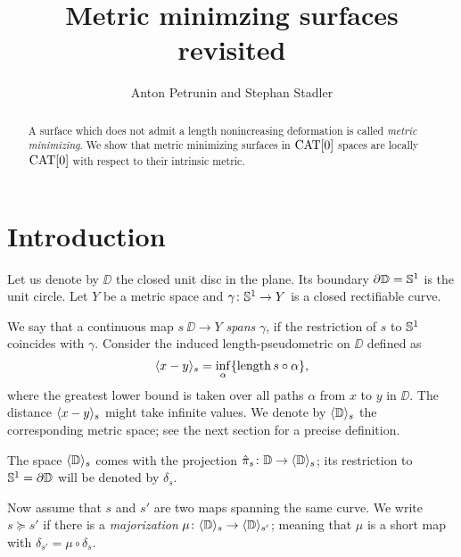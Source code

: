 \documentclass{article}
\begin{document}
\title{Metric minimzing surfaces revisited}
\author{Anton Petrunin and Stephan Stadler}


\date{}

\maketitle

\begin{abstract}
A surface which does not admit a length nonincreasing deformation is called \emph{metric minimizing}.
We show that metric minimizing surfaces in $\mathop{\rm CAT}\nolimits[0]$ spaces are locally $\mathop{\rm CAT}\nolimits[0]$ with respect to their intrinsic metric. 
\end{abstract}

\section{Introduction}

Let us denote by $\DD$ the closed unit disc in the plane.
Its boundary $\partial \mathbb{D}=\mathbb{S}^1$ is the unit circle.
Let $Y$ be a metric space and $\gamma\colon\mathbb{S}^1\to Y$ is a closed rectifiable curve.

We say that a continuous map $s\:\DD\to Y$ \emph{spans} $\gamma$,
if the restriction of $s$ to $\mathbb{S}^1$ coincides with $\gamma$.
Consider the induced length-pseudometric on $\DD$ defined as 
\[\langle x-y\rangle_s=\inf_\alpha\{\mathop{\rm length}\nolimits s\circ\alpha\},\]
where the greatest lower bound is taken over all paths $\alpha$ from $x$ to $y$ in $\DD$.
The distance $\langle x-y\rangle_s$ might take infinite values.
We denote by $\langle\mathbb{D}\rangle_s$ the corresponding metric space;
see the next section for a precise definition.

The space $\langle\mathbb{D}\rangle_s$ comes with the projection $ \hat\pi_s\colon\mathbb{D}\to\langle\mathbb{D}\rangle_s$;
its restriction to $\mathbb{S}^1=\partial\mathbb{D}$ will be denoted by $\delta_s$.

Now assume that $s$ and $s'$ are two maps spanning the same curve.
We write $s\succcurlyeq s'$ if there is a \emph{majorization}
$\mu\colon\langle\mathbb{D}\rangle_s\to \langle\mathbb{D}\rangle_{s'}$;
meaning that $\mu$ is a short map with $\delta_{s'}=\mu\circ\delta_s$.
\end{document}
